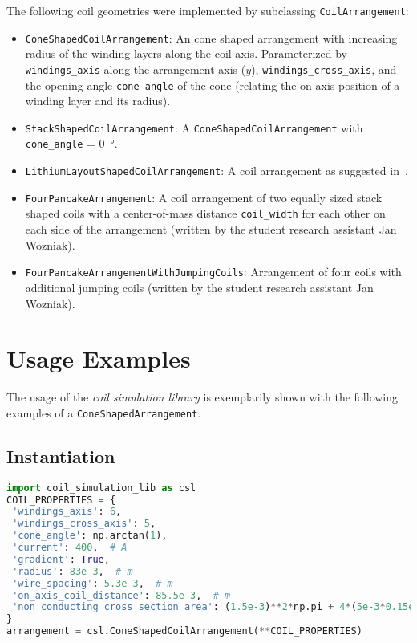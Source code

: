 The following coil geometries were implemented by subclassing \texttt{CoilArrangement}:
\begin{itemize}
    \item \texttt{ConeShapedCoilArrangement}: An cone shaped arrangement with increasing radius of the winding layers along the coil axis. Parameterized by \texttt{windings\_axis} along the arrangement axis ($y$), \texttt{windings\_cross\_axis}, and the opening angle \texttt{cone\_angle} of the cone (relating the on-axis position of a winding layer and its radius).
    \item \texttt{StackShapedCoilArrangement}: A \texttt{ConeShapedCoilArrangement} with \texttt{cone\_angle} = \SI[]{0}{\degree}.
    \item \texttt{LithiumLayoutShapedCoilArrangement}: A coil arrangement as suggested in~\cite{gantner_magnetic_2012}.
    \item \texttt{FourPancakeArrangement}: A coil arrangement of two equally sized stack shaped coils with a center-of-mass distance \texttt{coil\_width} for each other on each side of the arrangement (written by the student research assistant Jan Wozniak).
    \item \texttt{FourPancakeArrangementWithJumpingCoils}: Arrangement of four coils with additional jumping coils (written by the student research assistant Jan Wozniak).
\end{itemize}


\section*{Usage Examples}
The usage of the \textit{coil simulation library} is exemplarily shown with the following examples of a \texttt{ConeShapedArrangement}.

\subsection*{Instantiation}
\begin{lstlisting}[language=Python]
import coil_simulation_lib as csl
COIL_PROPERTIES = {
 'windings_axis': 6,
 'windings_cross_axis': 5,
 'cone_angle': np.arctan(1),
 'current': 400,  # A
 'gradient': True,
 'radius': 83e-3,  # m
 'wire_spacing': 5.3e-3,  # m
 'on_axis_coil_distance': 85.5e-3,  # m
 'non_conducting_cross_section_area': (1.5e-3)**2*np.pi + 4*(5e-3*0.15e-3)  # m^2
}
arrangement = csl.ConeShapedCoilArrangement(**COIL_PROPERTIES)
\end{lstlisting}


